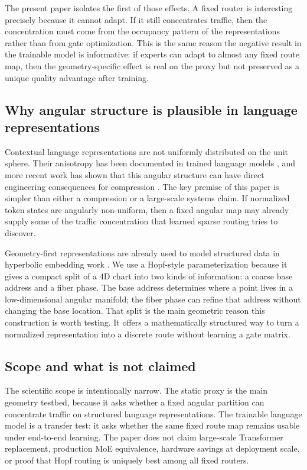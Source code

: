 \documentclass[10pt,letterpaper]{article}
\begin{document}
The present paper isolates the first of those effects. A fixed router is interesting precisely because it cannot adapt. If it still concentrates traffic, then the concentration must come from the occupancy pattern of the representations rather than from gate optimization. This is the same reason the negative result in the trainable model is informative: if experts can adapt to almost any fixed route map, then the geometry-specific effect is real on the proxy but not preserved as a unique quality advantage after training.

\subsection{Why angular structure is plausible in language representations}
Contextual language representations are not uniformly distributed on the unit sphere. Their anisotropy has been documented in trained language models \citep{ethayarajh2019anisotropy}, and more recent work has shown that this angular structure can have direct engineering consequences for compression \citep{turboquant2026}. The key premise of this paper is simpler than either a compression or a large-scale systems claim. If normalized token states are angularly non-uniform, then a fixed angular map may already supply some of the traffic concentration that learned sparse routing tries to discover.

Geometry-first representations are already used to model structured data in hyperbolic embedding work \citep{nickel2017poincare, ganea2018hyperbolic}. We use a Hopf-style parameterization because it gives a compact split of a 4D chart into two kinds of information: a coarse base address and a fiber phase. The base address determines where a point lives in a low-dimensional angular manifold; the fiber phase can refine that address without changing the base location. That split is the main geometric reason this construction is worth testing. It offers a mathematically structured way to turn a normalized representation into a discrete route without learning a gate matrix.

\subsection{Scope and what is not claimed}
The scientific scope is intentionally narrow. The static proxy is the main geometry testbed, because it asks whether a fixed angular partition can concentrate traffic on structured language representations. The trainable language model is a transfer test: it asks whether the same fixed route map remains usable under end-to-end learning. The paper does not claim large-scale Transformer replacement, production MoE equivalence, hardware savings at deployment scale, or proof that Hopf routing is uniquely best among all fixed routers.
\end{document}
